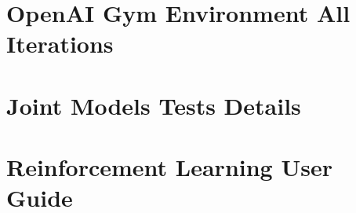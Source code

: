 \documentclass[12pt,twoside]{report}
\begin{document}
\chapter{OpenAI Gym Environment All Iterations}
\label{app:rl-iters}


\chapter{Joint Models Tests Details}
\label{app:joint}


\chapter{Reinforcement Learning User Guide}
\label{app:user-guide}

\end{document}
